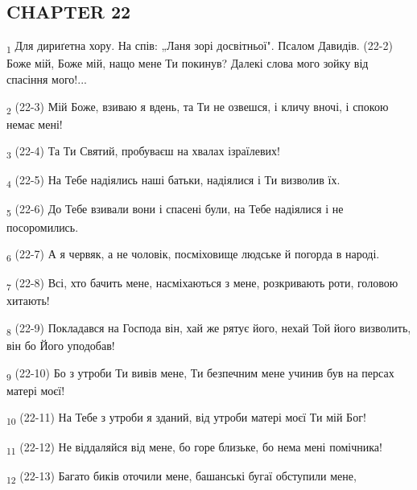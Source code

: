 \subsection{CHAPTER 22}
\begin{tcolorbox}
\textsubscript{1} Для дириґетна хору. На спів: „Ланя зорі досвітньої". Псалом Давидів. (22-2) Боже мій, Боже мій, нащо мене Ти покинув? Далекі слова мого зойку від спасіння мого!...
\end{tcolorbox}
\begin{tcolorbox}
\textsubscript{2} (22-3) Мій Боже, взиваю я вдень, та Ти не озвешся, і кличу вночі, і спокою немає мені!
\end{tcolorbox}
\begin{tcolorbox}
\textsubscript{3} (22-4) Та Ти Святий, пробуваєш на хвалах ізраїлевих!
\end{tcolorbox}
\begin{tcolorbox}
\textsubscript{4} (22-5) На Тебе надіялись наші батьки, надіялися і Ти визволив їх.
\end{tcolorbox}
\begin{tcolorbox}
\textsubscript{5} (22-6) До Тебе взивали вони і спасені були, на Тебе надіялися і не посоромились.
\end{tcolorbox}
\begin{tcolorbox}
\textsubscript{6} (22-7) А я червяк, а не чоловік, посміховище людське й погорда в народі.
\end{tcolorbox}
\begin{tcolorbox}
\textsubscript{7} (22-8) Всі, хто бачить мене, насміхаються з мене, розкривають роти, головою хитають!
\end{tcolorbox}
\begin{tcolorbox}
\textsubscript{8} (22-9) Покладався на Господа він, хай же рятує його, нехай Той його визволить, він бо Його уподобав!
\end{tcolorbox}
\begin{tcolorbox}
\textsubscript{9} (22-10) Бо з утроби Ти вивів мене, Ти безпечним мене учинив був на персах матері моєї!
\end{tcolorbox}
\begin{tcolorbox}
\textsubscript{10} (22-11) На Тебе з утроби я зданий, від утроби матері моєї Ти мій Бог!
\end{tcolorbox}
\begin{tcolorbox}
\textsubscript{11} (22-12) Не віддаляйся від мене, бо горе близьке, бо нема мені помічника!
\end{tcolorbox}
\begin{tcolorbox}
\textsubscript{12} (22-13) Багато биків оточили мене, башанські бугаї обступили мене,
\end{tcolorbox}
